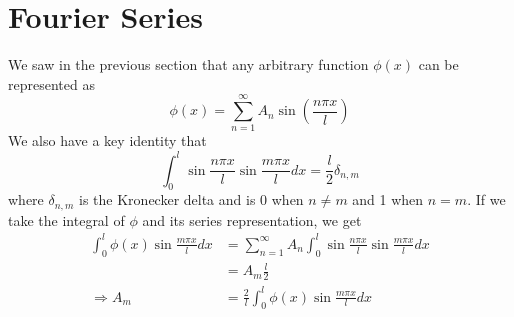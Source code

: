 \documentclass{article}
\theoremstyle{definition}
\begin{document}
\section{Fourier Series}
We saw in the previous section that any arbitrary function $\phi(x)$ can be represented as 
\begin{equation*}
    \phi (x) = \sum^\infty_{n=1} A_n \sin\left(\frac{n\pi x}{l}\right)
\end{equation*}
We also have a key identity that 
\begin{equation*}
    \int^l_0 \sin \frac{n\pi x}{l} \sin \frac{m\pi x}{l} dx = \frac{l}{2}\delta_{n,m}
\end{equation*}
where $\delta_{n,m}$ is the Kronecker delta and is 0 when $n\neq m$ and 1 when $n=m$. If we take the integral of $\phi$ and its series representation, we get 
\begin{equation*}
    \begin{split}
        \int^l_0 \phi(x)\sin \frac{m\pi x}{l}dx &= \sum^\infty_{n=1}A_n \int^l_0 \sin \frac{n\pi x}{l}\sin \frac{m\pi x}{l}dx\\ &= A_m \frac{l}{2} \\
        \Rightarrow A_m&=\frac{2}{l}\int^l_0 \phi(x)\sin \frac{m\pi x}{l}dx
    \end{split}
\end{equation*}
\end{document}
